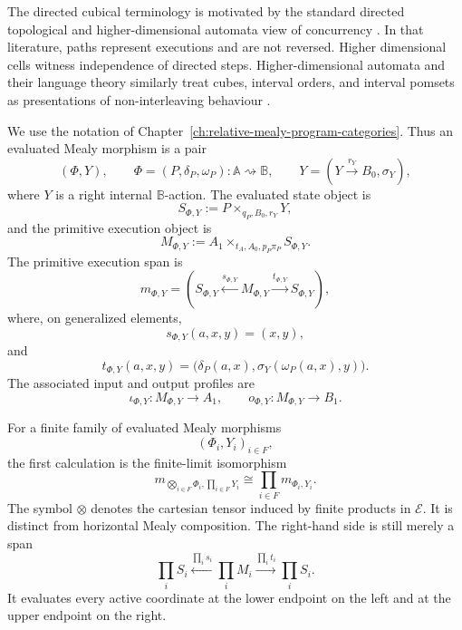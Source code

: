 The directed cubical terminology is motivated by the standard directed
topological and higher-dimensional automata view of concurrency
\cite{FajstrupGoubaultRaussen2006,FajstrupGoubaultHaucourtMimramRaussen2016,Grandis2003,Grandis2009,Gaucher2000}.
In that literature, paths represent executions and are not reversed. Higher
dimensional cells witness independence of directed steps. Higher-dimensional
automata and their language theory similarly treat cubes, interval orders, and
interval pomsets as presentations of non-interleaving behaviour
\cite{NielsenPlotkinWinskel1981,Pratt1991,Pratt2000,vanGlabbeek2006,FahrenbergJohansenStruthZiemianski2021,Fahrenberg_2024,ZouariZiemianskiFahrenberg2024,AmraneBazilleFahrenbergFortin2024}.

We use the notation of
Chapter~\ref{ch:relative-mealy-program-categories}. Thus an evaluated Mealy
morphism is a pair
\[
    (\Phi,Y),
    \qquad
    \Phi=(P,\delta_P,\omega_P):\mathbb A\rightsquigarrow\mathbb B,
    \qquad
    Y=(Y\xrightarrow{r_Y}B_0,\sigma_Y),
\]
where \(Y\) is a right internal \(\mathbb B\)-action. The evaluated state
object is
\[
    S_{\Phi,Y}:=P\times_{q_P,B_0,r_Y}Y,
\]
and the primitive execution object is
\[
    M_{\Phi,Y}
    :=
    A_1\times_{t_A,A_0,p_P\pi_P}S_{\Phi,Y}.
\]
The primitive execution span is
\[
    m_{\Phi,Y}
    =
    \left(
        S_{\Phi,Y}
        \xleftarrow{s_{\Phi,Y}}
        M_{\Phi,Y}
        \xrightarrow{t_{\Phi,Y}}
        S_{\Phi,Y}
    \right),
\]
where, on generalized elements,
\[
    s_{\Phi,Y}(a,x,y)=(x,y),
\]
and
\[
    t_{\Phi,Y}(a,x,y)
    =
    \bigl(\delta_P(a,x),\sigma_Y(\omega_P(a,x),y)\bigr).
\]
The associated input and output profiles are
\[
    \iota_{\Phi,Y}:M_{\Phi,Y}\to A_1,
    \qquad
    o_{\Phi,Y}:M_{\Phi,Y}\to B_1.
\]

For a finite family of evaluated Mealy morphisms
\[
    (\Phi_i,Y_i)_{i\in F},
\]
the first calculation is the finite-limit isomorphism
\[
    m_{\bigotimes_{i\in F}\Phi_i,\prod_{i\in F}Y_i}
    \cong
    \prod_{i\in F}m_{\Phi_i,Y_i}.
\]
The symbol \(\otimes\) denotes the cartesian tensor induced by finite products
in \(\mathcal E\). It is distinct from horizontal Mealy composition. The
right-hand side is still merely a span
\[
    \prod_iS_i
    \xleftarrow{\prod_i s_i}
    \prod_iM_i
    \xrightarrow{\prod_i t_i}
    \prod_iS_i.
\]
It evaluates every active coordinate at the lower endpoint on the left and at
the upper endpoint on the right.

